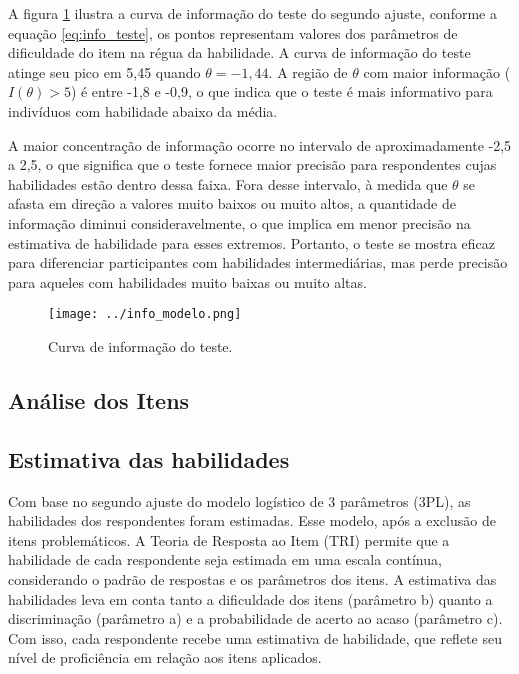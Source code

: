 A figura \ref{fig:info} ilustra a curva de informação do teste do segundo ajuste, conforme a equação \ref{eq:info_teste}, os pontos representam valores dos parâmetros de dificuldade do item na régua da habilidade. A curva de informação do teste atinge seu pico em 5,45 quando $\theta = -1,44$. A região de $\theta$ com maior informação ($I(\theta) > 5$) é entre -1,8 e -0,9, o que indica que o teste é mais informativo para indivíduos com habilidade abaixo da média. 

A maior concentração de informação ocorre no intervalo de aproximadamente -2,5 a 2,5, o que significa que o teste fornece maior precisão para respondentes cujas habilidades estão dentro dessa faixa. Fora desse intervalo, à medida que $\theta$ se afasta em direção a valores muito baixos ou muito altos, a quantidade de informação diminui consideravelmente, o que implica em menor precisão na estimativa de habilidade para esses extremos. Portanto, o teste se mostra eficaz para diferenciar participantes com habilidades intermediárias, mas perde precisão para aqueles com habilidades muito baixas ou muito altas.

\begin{figure}[H]
	\centering
	\texttt{[image: ../info\_modelo.png]}
	\caption{Curva de informação do teste.}
	\label{fig:info}
\end{figure}

\subsection{Análise dos Itens}



\subsection{Estimativa das habilidades}

Com base no segundo ajuste do modelo logístico de 3 parâmetros (3PL), as habilidades dos respondentes foram estimadas. Esse modelo, após a exclusão de itens problemáticos. A Teoria de Resposta ao Item (TRI) permite que a habilidade  de cada respondente seja estimada em uma escala contínua, considerando o padrão de respostas e os parâmetros dos itens. A estimativa das habilidades leva em conta tanto a dificuldade dos itens (parâmetro b) quanto a discriminação (parâmetro a) e a probabilidade de acerto ao acaso (parâmetro c). Com isso, cada respondente recebe uma estimativa de habilidade, que reflete seu nível de proficiência em relação aos itens aplicados.

